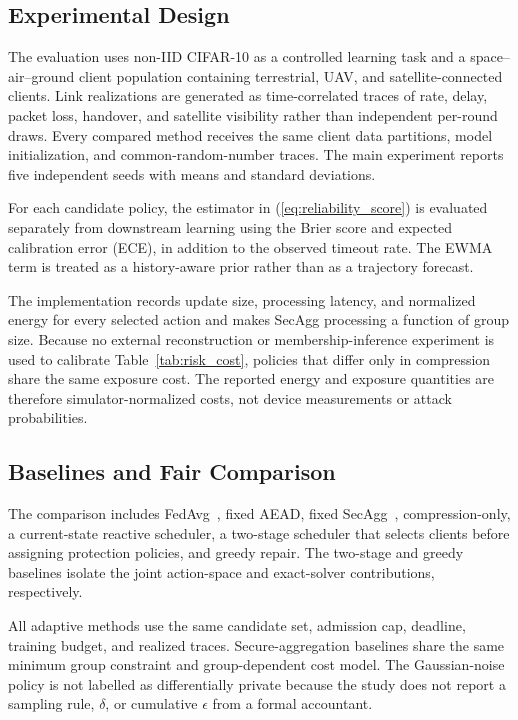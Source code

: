 \documentclass[preprint,12pt]{elsarticle}
\begin{document}
\subsection{Experimental Design}

The evaluation uses non-IID CIFAR-10 as a controlled learning task and a space--air--ground client population containing terrestrial, UAV, and satellite-connected clients. Link realizations are generated as time-correlated traces of rate, delay, packet loss, handover, and satellite visibility rather than independent per-round draws. Every compared method receives the same client data partitions, model initialization, and common-random-number traces. The main experiment reports five independent seeds with means and standard deviations.

For each candidate policy, the estimator in (\ref{eq:reliability_score}) is evaluated separately from downstream learning using the Brier score and expected calibration error (ECE), in addition to the observed timeout rate. The EWMA term is treated as a history-aware prior rather than as a trajectory forecast.

The implementation records update size, processing latency, and normalized energy for every selected action and makes SecAgg processing a function of group size. Because no external reconstruction or membership-inference experiment is used to calibrate Table~\ref{tab:risk_cost}, policies that differ only in compression share the same exposure cost. The reported energy and exposure quantities are therefore simulator-normalized costs, not device measurements or attack probabilities.

\subsection{Baselines and Fair Comparison}

The comparison includes FedAvg~\cite{mcmahan2017communication}, fixed AEAD, fixed SecAgg~\cite{bonawitz2017secureagg}, compression-only, a current-state reactive scheduler, a two-stage scheduler that selects clients before assigning protection policies, and greedy repair. The two-stage and greedy baselines isolate the joint action-space and exact-solver contributions, respectively.

All adaptive methods use the same candidate set, admission cap, deadline, training budget, and realized traces. Secure-aggregation baselines share the same minimum group constraint and group-dependent cost model. The Gaussian-noise policy is not labelled as differentially private because the study does not report a sampling rule, \(\delta\), or cumulative \(\epsilon\) from a formal accountant.
\end{document}
